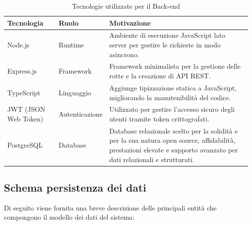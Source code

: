 \documentclass{article}
\begin{document}
\begin{table}[htbp]
\centering
\caption{Tecnologie utilizzate per il Back-end}
\vspace{0.5em}
\renewcommand{\arraystretch}{1.5}
\begin{tabularx}{\textwidth}{|l|l|X|}
\hline
\rowcolor[HTML]{010066} 
{\color[HTML]{EFEFEF} \textbf{Tecnologia}} & {\color[HTML]{FFFFFF} \textbf{Ruolo}} & {\color[HTML]{FFFFFF} \textbf{Motivazione}} \\ \hline

Node.js & Runtime & Ambiente di esecuzione JavaScript lato server per gestire le richieste in modo asincrono. \\ \hline

Express.js & Framework & Framework minimalista per la gestione delle rotte e la creazione di API REST. \\ \hline

TypeScript & Linguaggio & Aggiunge tipizzazione statica a JavaScript, migliorando la manutenibilità del codice. \\ \hline

JWT (JSON Web Token) & Autenticazione & Utilizzato per gestire l'accesso sicuro degli utenti tramite token crittografati. \\ \hline

PostgreSQL & Database & Database relazionale scelto per la solidità e per la sua natura open source, affidabilità, prestazioni elevate e supporto avanzato per dati relazionali e strutturati. \\ \hline
\end{tabularx}
\end{table}

\newpage
\subsection{Schema persistenza dei dati}


Di seguito viene fornita una breve descrizione delle principali entità che compongono il modello dei dati del sistema:
\end{document}
